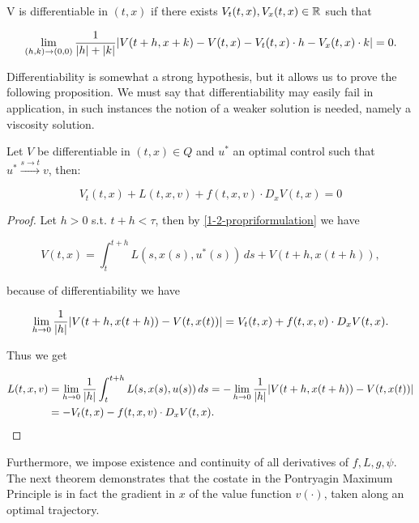 \begin{definition}
    V is differentiable in $(t,x)$ if there exists $V_t(t,x),V_x(t,x)\in\mathbb{R}$ such that

    \begin{equation}
        \lim_{(h,k)\to(0,0)} \frac{1}{\abs{h}+\abs{k}}\abs{V(t+h,x+k)-V(t,x)-V_t(t,x)\cdot h-V_x(t,x)\cdot k}=0.
    \end{equation}
\end{definition}

Differentiability is somewhat a strong hypothesis, but it allows us to prove the following
proposition. We must say that differentiability may easily fail in application, in such instances 
the notion of a weaker solution is needed, namely a viscosity solution.

\begin{theorem}
    Let $V$ be differentiable in $(t,x)\in Q$ and $u^{\ast}$ an optimal control
    such that $u^{\ast}\xrightarrow{s\to t}v$, then:

    \begin{equation}\label{1-3-dynamicprogrammeq}
        V_t(t,x) + L(t,x,v) + f(t,x,v)\cdot D_xV(t,x) = 0
    \end{equation}

    \begin{proof}
        Let $h>0$ s.t. $t+h<\tau$, then by \eqref{1-2-propriformulation} we have

        \[ V(t,x) = \int_t^{t+h} L(s,x(s),u^{\ast}(s)) \,ds + V(t+h,x(t+h)),\]

        because of differentiability we have

        \[\lim_{h\to0}\frac{1}{\abs{h}}\abs{V(t+h,x(t+h))-V(t,x(t))} = V_t(t,x) + f(t,x,v)\cdot D_xV(t,x).\]

        Thus we get

        \begin{align*}
        L(t,x,v) & = \lim_{h\to0} \frac{1}{\abs{h}} \int_t^{t+h} L(s,x(s),u(s)) \,ds = -\lim_{h\to0} \frac{1}{\abs{h}}\abs{V(t+h,x(t+h))-V(t,x(t))} \\
        & = - V_t(t,x) - f(t,x,v)\cdot D_xV(t,x).
        \end{align*}
    \end{proof}
\end{theorem}

Furthermore, we impose existence and continuity of all derivatives of $f,L,g,\psi$.
The next theorem demonstrates that the costate in the Pontryagin Maximum
Principle is in fact the gradient in $x$ of the value function $v(\cdot)$, taken along an optimal
trajectory. 

